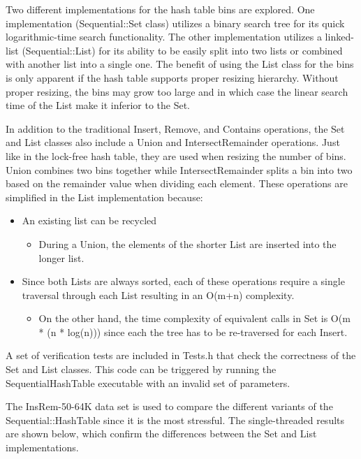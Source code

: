\documentclass[11pt]{article} %
\begin{document}
Two different implementations for the hash table bins are explored. One implementation (Sequential::Set class) utilizes a binary search tree for its quick logarithmic-time search functionality. The other implementation utilizes a linked-list (Sequential::List) for its ability to be easily split into two lists or combined with another list into a single one. The benefit of using the List class for the bins is only apparent if the hash table supports proper resizing hierarchy. Without proper resizing, the bins may grow too large and in which case the linear search time of the List make it inferior to the Set.

In addition to the traditional Insert, Remove, and Contains operations, the Set and List classes also include a Union and IntersectRemainder operations. Just like in the lock-free hash table, they are used when resizing the number of bins. Union combines two bins together while IntersectRemainder splits a bin into two based on the remainder value when dividing each element. These operations are simplified in the List implementation because:

\begin{itemize}
	\item An existing list can be recycled
	\begin{itemize}
		\item During a Union, the elements of the shorter List are inserted into the longer list.
	\end{itemize}
	\item Since both Lists are always sorted, each of these operations require a single traversal through each List resulting in an O(m+n) complexity.
	\begin{itemize}
		\item On the other hand, the time complexity of equivalent calls in Set is O(m * (n * log(n))) since each the tree has to be re-traversed for each Insert.
	\end{itemize}
\end{itemize}

A set of verification tests are included in Tests.h that check the correctness of the Set and List classes. This code can be triggered by running the SequentialHashTable executable with an invalid set of parameters.

The InsRem-50-64K data set is used to compare the different variants of the Sequential::HashTable since it is the most stressful. The single-threaded results are shown below, which confirm the differences between the Set and List implementations.
\end{document}
